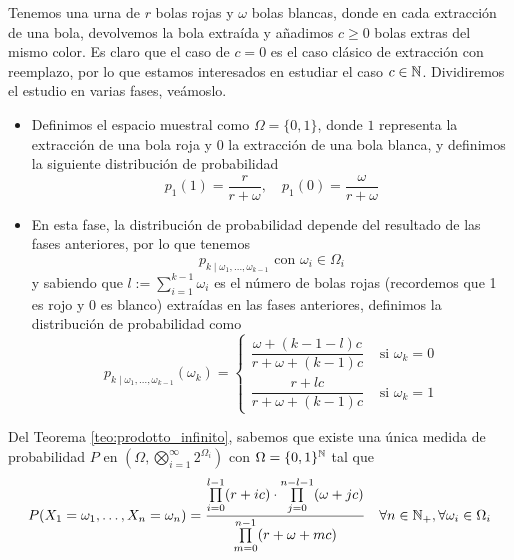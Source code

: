 \begin{ejemplo}
    Tenemos una urna de $r$ bolas rojas y $\omega$ bolas blancas, donde en cada extracción de una bola, devolvemos la bola extraída y añadimos $c\geq 0$ bolas extras del mismo color. Es claro que el caso de $c=0$ es el caso clásico de extracción con reemplazo, por lo que estamos interesados en estudiar el caso $c\in \mathbb{N}$. Dividiremos el estudio en varias fases, veámoslo. 
    \begin{itemize}
        \item[Fase 1.] Definimos el espacio muestral como $\Omega = \{0,1\}$, donde $1$ representa la extracción de una bola roja y $0$ la extracción de una bola blanca, y definimos la siguiente distribución de probabilidad
        \begin{equation*}
            p_1(1) = \dfrac{r}{r+\omega}, \quad p_1(0) = \dfrac{\omega}{r+\omega} 
        \end{equation*}
        \item[Fase $k\geq 2$.] En esta fase, la distribución de probabilidad depende del resultado de las fases anteriores, por lo que tenemos 
        \begin{equation*}
            p_{k\mid \omega_1, \ldots, \omega_{k-1}} \text{ con } \omega_i \in \Omega_i
        \end{equation*}
        y sabiendo que $l:=\sum\limits_{i=1}^{k-1} \omega_i$ es el número de bolas rojas (recordemos que 1 es rojo y 0 es blanco) extraídas en las fases anteriores, definimos la distribución de probabilidad como
        \begin{equation*}
            p_{k\mid \omega_1, \ldots, \omega_{k-1}}(\omega_k) = \begin{cases}
                \dfrac{\omega + (k-1 - l)c}{r + \omega + (k-1)c}  & \text{ si } \omega_k =0 \\
                \dfrac{r + lc}{r + \omega + (k-1)c} & \text{ si } \omega_k =1
            \end{cases}
        \end{equation*}
    \end{itemize}
    Del Teorema \ref{teo:prodotto_infinito}, sabemos que existe una única medida de probabilidad $P$ en $(\Omega, \bigotimes\limits_{i=1}^{\infty} 2^{\Omega_i})$ con $\Omega=\{0,1\}^{\mathbb{N}}$ tal que 
    \begin{equation*}
        P(X_1=\omega_1, \ldots, X_n=\omega_n) = \dfrac{\prod\limits_{i=0}^{l-1} (r + ic) \cdot \prod\limits_{j=0}^{n-l-1} (\omega + jc)}{\prod\limits_{m=0}^{n-1} (r + \omega + mc)} \quad \forall n\in \N_+, \forall \omega_i \in \Omega_i

\end{equation*}
\end{ejemplo}
